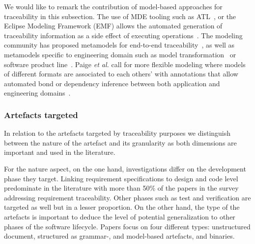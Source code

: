 We would like to remark the contribution of model-based approaches for traceability in this subsection. The use of MDE tooling such as ATL~\cite{Santiago_2013,Jim_nez_2013}, or the Eclipse Modeling Framework (EMF) allows the automated generation of traceability information as a side effect of executing operations~\cite{galvao2007-survey-traceability-in-MDE,winkler2010-survey-traceability-and-MDE}. The modeling community has proposed  metamodels for end-to-end traceability~\cite{heisig2019-generic-traceability-metamodel-end-to-end-capra,Haidrar_2016}, as well as metamodels specific to engineering domain such as model transformation~\cite{Jim_nez_2013,anquetil2010-model-driven-tracea-for-SPL,vara2014-traceability-in-MDD-MTransfo,bonde2006-different-levels-of-abstraction} or software product line~\cite{Jim_nez_2013,vara2014-traceability-in-MDD-MTransfo}. 
Paige \textit{et al.} call for more flexible modeling where models of different formats are associated to each others' with annotations that allow automated bond or dependency inference between both application and engineering domains~\cite{seiler2019-comparing-trac-through-IR-Commits-Logs,paige2017-changing-mde}.

\subsubsection{Artefacts targeted} 
In relation to the artefacts targeted by traceability purposes we distinguish between the nature of the artefact and its granularity as both dimensions are important and used in the literature. 

For the nature aspect, on the one hand, investigations differ on the development phase they target. Linking requirement specifications to design and code level predominate in the literature with more than 50\% of the papers in the survey addressing requirement traceability. Other phases such as test and verification are targeted as well but in a lesser proportion. 
On the other hand, the type of the artefacts is important to deduce the level of potential generalization to other phases of the software lifecycle. Papers focus on four different types: unstructured document, structured as grammar-, and model-based artefacts, and binaries.


